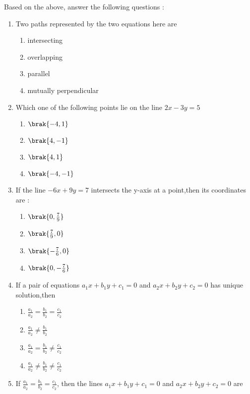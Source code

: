 \begin{enumerate}[label=\thesection.\arabic*.,ref=\thesection.\theenumi]
Based on the above, answer the following questions :
 \begin{enumerate}[label=(\roman*)]
 \item Two paths represented by the two equations here are 
  \begin{enumerate}[label=(\Alph*)]
             \item intersecting
             \item overlapping
             \item parallel
             \item mutually perpendicular
    \end{enumerate}
\item Which one of the following points lie on the line $2x-3y=5$
\begin{enumerate}[label=(\Alph*)]
             \item $\brak{ -4,1 }$
             \item $\brak{ 4,-1 }$
             \item $\brak{ 4,1 }$
             \item $\brak{ -4,-1 }$
    \end{enumerate}
\item If the line $-6x+9y=7$ intersects the y-axis at a point,then its coordinates are :
\begin{enumerate}[label=(\Alph*)]
             \item $\brak{0,\frac{7}{9}}$
             \item $\brak{\frac{7}{9},0}$
             \item $\brak{-\frac{7}{6},0}$
             \item $\brak{0,-\frac{7}{6}}$
\end{enumerate}
\item If a pair of equations $a_1x+b_1y+c_1=0$ and  $a_2x+b_2y+c_2=0$ has unique solution,then
\begin{enumerate}[label=(\Alph*)]
             \item $\frac{a_1}{a_2}=\frac{b_1}{b_2}=\frac{c_1}{c_2}$
             \item  $\frac{a_1}{a_2}\neq\frac{b_1}{b_2}$
             \item $\frac{a_1}{a_2}=\frac{b_1}{b_2}\neq\frac{c_1}{c_2}$
             \item $\frac{a_1}{a_2}\neq\frac{b_1}{b_2}\neq\frac{c_1}{c_2}$
\end{enumerate}
\item If $\frac{a_1}{a_2}=\frac{b_1}{b_2}=\frac{c_1}{c_2}$, then the lines $a_1x+b_1y+c_1=0$ and  $a_2x+b_2y+c_2=0$ are

\end{enumerate}
\end{enumerate}
